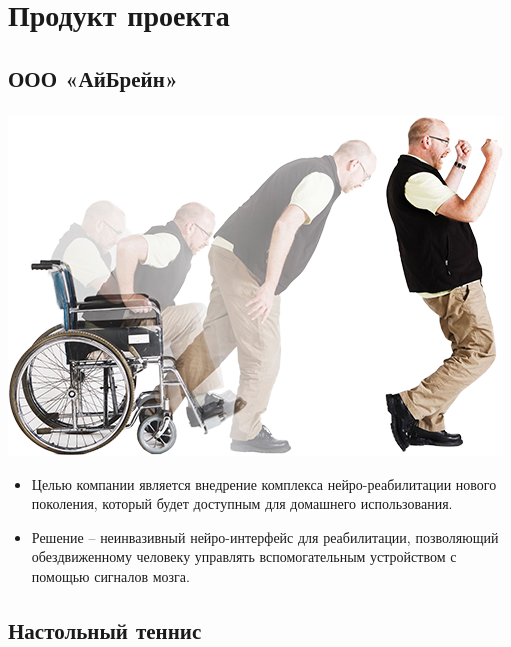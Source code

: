 \section{Продукт проекта}
\subsection{ООО «АйБрейн»}

\begin{frame}
\frametitle{\insertsection} 
\framesubtitle{\insertsubsection}

\begin{minipage}[h]{0.4\linewidth}
    \includegraphics[width=\linewidth]{2.png}
\end{minipage}
\hfill 
\begin{minipage}[h]{0.5\linewidth}
    \begin{itemize}
        \item Целью компании является внедрение комплекса нейро-реабилитации нового поколения, который будет доступным для домашнего использования.
        \item 	Решение – неинвазивный нейро-интерфейс для реабилитации, позволяющий обездвиженному человеку управлять вспомогательным устройством с помощью сигналов мозга.
    \end{itemize}
\end{minipage}

\end{frame}


\subsection{Настольный теннис}

